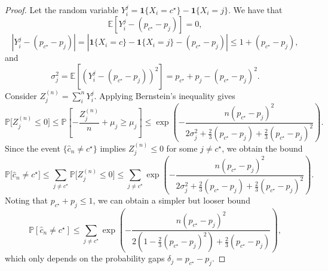\begin{proof}
Let the random variable $Y_i^{j} = \mathbf 1\{X_i=c^\star\}-\mathbf 1\{X_i=j\}$. We have that 
$$\mathbb{E}\left[Y_i^j- (p_{c^\star}-p_j)\right] = 0,$$
    $$
    \left \lvert Y_i^j - (p_{c^\star}-p_j)\right\rvert = \left \lvert\mathbf 1\{X_i=c\}-\mathbf 1\{X_i=j\}- (p_{c^\star}-p_j)  \right\rvert\leq 1+(p_{c^\star}-p_j),
    $$ 
    and
    $$
    \sigma_j^2 = \mathbb{E}\left[\left(Y_i^j- (p_{c^\star}-p_j)\right)^2\right] = p_{c^\star} + p_j - (p_{c^\star}-p_j)^2.
    $$
    Consider $Z_j^{(n)}=\sum_i^n Y_i^j$. 
    Applying Bernstein's inequality gives
    $$
      \mathbb{P}\bigl[Z_j^{(n)} \leq 0\bigr] \leq \mathbb{P}\left[-\frac{Z_j^{(n)}}{n}+ \mu_j\geq \mu_j\right]  \leq \exp\left(-\frac{n(p_{c^\star}-p_j)^2}{2\sigma_j^2 + \frac{2}{3}(p_{c^\star}-p_j) + \frac{2}{3}(p_{c^\star}-p_j)^2}\right).
    $$
    Since the event $\{\hat{c}_n\neq c^\star\}$ implies $Z_j^{(n)}\le 0$ for some $j\neq c^\star$, we obtain the bound
$$
    \mathbb{P}\bigl[\hat{c}_n\neq c^\star\bigr]
    \le \sum_{j\neq c^\star}\mathbb{P}\bigl[Z_j^{(n)}\le 0\bigr]
    \le \sum_{j\neq c^\star}\exp\left(-\frac{n(p_{c^\star}-p_j)^2}{2\sigma_j^2 + \frac{2}{3}(p_{c^\star}-p_j) + \frac{2}{3}(p_{c^\star}-p_j)^2}\right).
$$ 
Noting that $p_{c^\star} + p_j \leq 1$, we can obtain a simpler but looser bound 
$$
\mathbb{P}[\hat{c}_n \neq c^\star] \leq \sum_{j \neq c^\star}\exp\left(-\frac{n (p_{c^\star} - p_j)^2}{2\left(1 - \frac{2}{3}(p_{c^\star} - p_j)^2\right) + \frac{2}{3}(p_{c^\star} - p_j)}\right),
$$
which only depends on the probability gaps $\delta_j = p_{c^\star} - p_j$.
\end{proof}